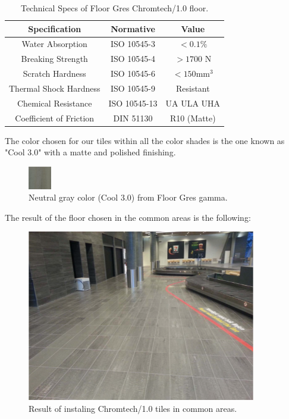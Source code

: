 	\begin{table}[H]
	\centering
	\begin{tabular}{|c|c|c|}
	\hline
	Specification & Normative & Value\\
	\hline
	Water Absorption & ISO 10545-3 & $<0.1\%$\\
	\hline
	Breaking Strength & ISO 10545-4 & $>1700$ N\\
	\hline
	Scratch Hardness & ISO 10545-6 & $< 150 \mathrm{mm^3}$\\
	\hline
	Thermal Shock Hardness & ISO 10545-9 & Resistant\\
	\hline
	Chemical Resistance & ISO 10545-13 & UA ULA UHA\\
	\hline
	Coefficient of Friction & DIN 51130 & R10 (Matte)\\
	\hline
	\end{tabular}
	\caption{Technical Specs of Floor Gres Chromtech/1.0 floor.}
	\end{table}
	
The color chosen for our tiles within all the color shades is the one known as "Cool 3.0" with a matte and polished finishing.
	\begin{figure}[H]
	\centering
\includegraphics[width=1cm]{./images/Color}
\caption{Neutral gray color (Cool 3.0) from Floor Gres gamma.}
\end{figure}

The result of the floor chosen in the common areas is the following:
\begin{figure}[H]
	\centering
\includegraphics[width=10cm]{./images/Resultado}
\caption{Result of instaling Chromtech/1.0 tiles in common areas.}
\end{figure}
